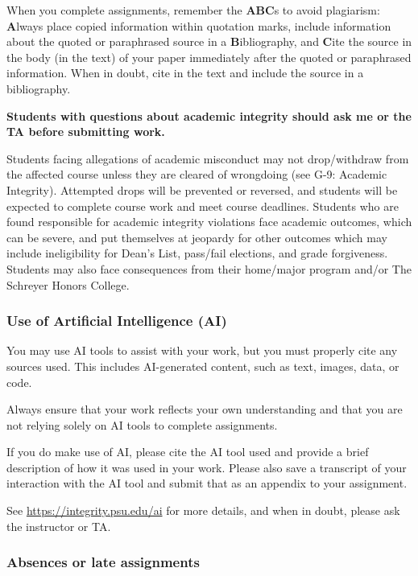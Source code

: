 \documentclass[
  letterpaper,
  DIV=11,
  numbers=noendperiod]{scrartcl}
\begin{document}
When you complete assignments, remember the \textbf{ABC}s to avoid
plagiarism: \textbf{A}lways place copied information within quotation
marks, include information about the quoted or paraphrased source in a
\textbf{B}ibliography, and \textbf{C}ite the source in the body (in the
text) of your paper immediately after the quoted or paraphrased
information. When in doubt, cite in the text and include the source in a
bibliography.

\textbf{Students with questions about academic integrity should ask me
or the TA before submitting work.}

Students facing allegations of academic misconduct may not drop/withdraw
from the affected course unless they are cleared of wrongdoing (see G-9:
Academic Integrity). Attempted drops will be prevented or reversed, and
students will be expected to complete course work and meet course
deadlines. Students who are found responsible for academic integrity
violations face academic outcomes, which can be severe, and put
themselves at jeopardy for other outcomes which may include
ineligibility for Dean's List, pass/fail elections, and grade
forgiveness. Students may also face consequences from their home/major
program and/or The Schreyer Honors College.

\subsubsection{Use of Artificial Intelligence
(AI)}\label{use-of-artificial-intelligence-ai}

You may use AI tools to assist with your work, but you must properly
cite any sources used. This includes AI-generated content, such as text,
images, data, or code.

Always ensure that your work reflects your own understanding and that
you are not relying solely on AI tools to complete assignments.

If you do make use of AI, please cite the AI tool used and provide a
brief description of how it was used in your work. Please also save a
transcript of your interaction with the AI tool and submit that as an
appendix to your assignment.

See \url{https://integrity.psu.edu/ai} for more details, and when in
doubt, please ask the instructor or TA.

\subsubsection*{Absences or late
assignments}\label{late-missed-assignments}
\end{document}
